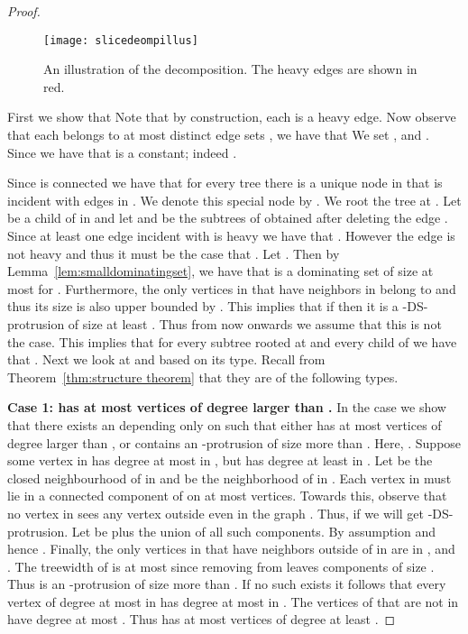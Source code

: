 \documentclass[11pt]{article}
\begin{document}
\begin{proof}
\begin{figure}[t]
\begin{center}
\texttt{[image: slicedeompillus]}
\end{center}
 \caption{\label{illus-decompos} An illustration of the decomposition. The heavy edges are shown in red.}
\end{figure}

First we show that  
Note that by construction, each   is a heavy edge. Now observe that each   belongs to at most  distinct edge sets , we have that  
We set , and . Since  we have that  is a constant; indeed . 



Since  is connected we have that for every tree  there is a unique node in  that is incident with  edges in . We denote this special node by . We root the tree  at . Let  be a child of  in  and let   and  be the subtrees of  obtained after deleting the edge . Since at least one edge incident with   is heavy we have that . However the edge  is not heavy and thus it must be the case that . Let . Then  by Lemma~\ref{lem:smalldominatingset}, we have that   is a dominating set of size at most  for . Furthermore, the only vertices in  that have neighbors in  belong to  and thus its size is also upper bounded by . This implies that if  then it is a  -{\sc DS}-protrusion of size at least . Thus  from now onwards we assume that this is not the case. This implies that for every subtree rooted at  and every child  of   we have that 
 . Next we look at   and based on its type.  Recall from Theorem~\ref{thm:structure theorem} that they are of the following types. 
 
 \medskip
 
 \noindent 
 {\bf Case 1:    has at most  vertices of degree larger than .} 
In the case 
we show that there exists an  depending only on  such that either  has at most  vertices of degree larger than ,  or  contains an -protrusion of size more than . Here, . Suppose some vertex  in  has degree at most  in  , but has degree at least  in . Let  be the closed neighbourhood of  in  and  be the neighborhood of  in . 
Each vertex in  must lie in a connected component  of  on at most  vertices. Towards this, observe that no vertex in  sees any vertex outside  even in the graph .  Thus, if  we will get  -{\sc DS}-protrusion. Let  be  plus the union of all such components. By assumption  and hence . Finally, the only vertices in  that have neighbors outside of  in  are in , and . The treewidth of  is at most  since removing  from  leaves components of size . Thus  is an -protrusion of size more than . If no such  exists it follows that every vertex of degree at most  in  has degree at most  in . The vertices of   that are not in  have degree at most . Thus    has at most  vertices of degree at least .


\end{proof}
\end{document}
